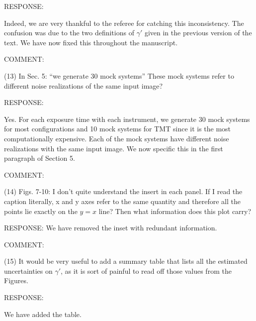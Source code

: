 \documentclass[a4paper,11pt]{article}
\begin{document}
RESPONSE: 

Indeed, we are very thankful to the referee for catching this
inconsistency. The confusion was due to the two definitions of
$\gamma'$ given in the previous version of the text. We have now fixed
this throughout the manuscript.


COMMENT:

(13) In Sec. 5: ``we generate 30 mock systems'' These mock systems
refer to different noise realizations of the same input image?

RESPONSE:

Yes. For each exposure time with each instrument, we generate 30 mock
systems for most configurations and 10 mock systems for TMT since it
is the most computationally expensive.  Each of the mock systems have
different noise realizations with the same input image. We now
specific this in the first paragraph of Section 5.


COMMENT:

(14) Figs. 7-10: I don't quite understand the insert in each panel. If
I read the caption literally, x and y axes refer to the same quantity
and therefore all the points lie exactly on the $y = x$ line? Then
what information does this plot carry?

RESPONSE:
We have removed the inset with redundant information.

COMMENT:

(15) It would be very useful to add a summary table that lists all the
estimated uncertainties on $\gamma'$, as it is sort of painful to read
off those values from the Figures.


RESPONSE:

We have added the table.
\end{document}
